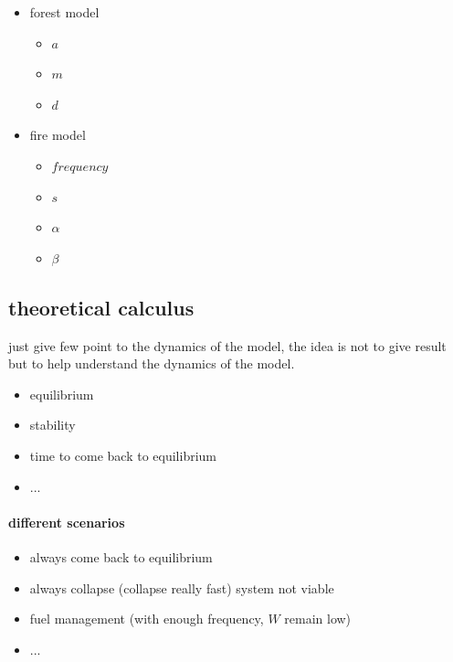\documentclass{article}
\begin{document}
\begin{itemize}
    \item forest model
    \begin{itemize}
        \item $a$ 
        \item $m$ 
        \item $d$
    \end{itemize}
    \item fire model
    \begin{itemize}
        \item $frequency$ 
        \item $s$
        \item $\alpha$
        \item $\beta$
    \end{itemize}
\end{itemize}



\subsection{theoretical calculus}

just give few point to the dynamics of the model, the idea is not to give result but to help understand the dynamics of the model.

\begin{itemize}
    \item equilibrium
    \item stability
    \item time to come back to equilibrium 
    \item ...
\end{itemize}


\paragraph{different scenarios} 
\begin{itemize}
    \item always come back to equilibrium
    \item always collapse (collapse really fast) system not viable
    \item fuel management (with enough frequency, $W$ remain low)
    \item ...
\end{itemize}
\end{document}
